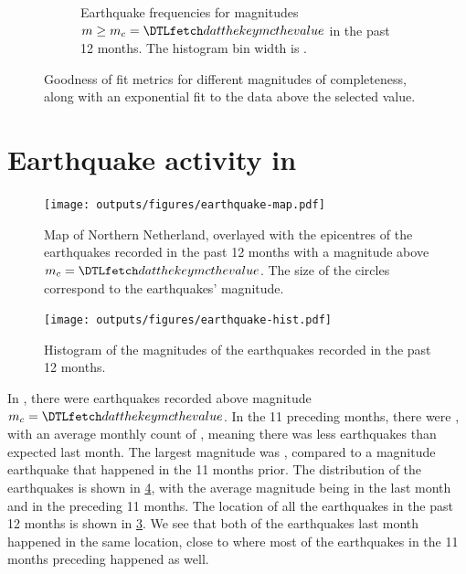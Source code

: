 \documentclass[11pt]{article}
\begin{document}
\begin{figure}[htp]
\begin{subfigure}[b]{0.49\textwidth}
    \caption{Earthquake frequencies for magnitudes $m\geq m_c=\dat{mc}$ in the past 12 months. The histogram bin width is .}
    \label{fig:hist}
\end{subfigure}
\caption{Goodness of fit metrics for different magnitudes of completeness, along with an exponential fit
to the data above the selected value.}
\label{fig:figs1}
\end{figure}

\newpage

\section*{Earthquake activity in }%

\begin{figure}[htp]
\begin{center}
    \texttt{[image: outputs/figures/earthquake-map.pdf]}
\end{center}
\caption{Map of Northern Netherland, overlayed with the epicentres of the earthquakes recorded in the past 12 months with
    a magnitude above $m_c=\protect\dat{mc}$. The size of the circles correspond to the earthquakes' magnitude.}
\label{fig:map}
\end{figure}

\begin{figure}[htp]
\begin{center}
    \texttt{[image: outputs/figures/earthquake-hist.pdf]}
\end{center}
\caption{Histogram of the magnitudes of the earthquakes recorded in the past 12 months.}
\label{fig:hist2}
\end{figure}

In , there were  earthquakes recorded above magnitude
$m_c=\dat{mc}$. In the 11 preceding months, there were , with an average monthly
count of , meaning there was less earthquakes than expected last month.
The largest magnitude was , compared to a magnitude  earthquake that
happened in the 11 months prior. The distribution of the earthquakes is shown in \cref{fig:hist2}, with the
average magnitude being  in the last month and  in the preceding 11 months.
The location of all the earthquakes in the past 12 months is shown in \cref{fig:map}.
We see that both of the earthquakes last month happened in the same location, close to where most of the earthquakes in the
11 months preceding happened as well.



\end{document}
